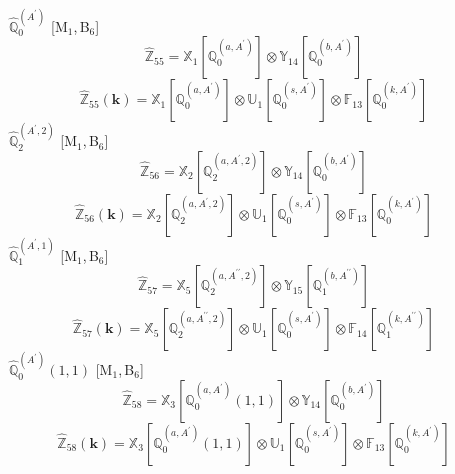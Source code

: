 \documentclass[fleqn,10pt,landscape]{article}
\begin{document}
\begin{itemize}
\vspace{4mm}
\noindent {} $\,\,\,\hat{\mathbb{Q}}_{0}^{(A^{\prime})}$ [M$_{1}$,\,B$_{6}$]
\begin{dmath*}
\hat{\mathbb{Z}}_{55}=\mathbb{X}_{1}[\mathbb{Q}_{0}^{(a,A^{\prime})}] \otimes\mathbb{Y}_{14}[\mathbb{Q}_{0}^{(b,A^{\prime})}]
\end{dmath*}
\begin{dmath*}
\hat{\mathbb{Z}}_{55}(\bm{k})=\mathbb{X}_{1}[\mathbb{Q}_{0}^{(a,A^{\prime})}] \otimes\mathbb{U}_{1}[\mathbb{Q}_{0}^{(s,A^{\prime})}] \otimes\mathbb{F}_{13}[\mathbb{Q}_{0}^{(k,A^{\prime})}]
\end{dmath*}
\vspace{4mm}
\noindent {} $\,\,\,\hat{\mathbb{Q}}_{2}^{(A^{\prime},2)}$ [M$_{1}$,\,B$_{6}$]
\begin{dmath*}
\hat{\mathbb{Z}}_{56}=\mathbb{X}_{2}[\mathbb{Q}_{2}^{(a,A^{\prime},2)}] \otimes\mathbb{Y}_{14}[\mathbb{Q}_{0}^{(b,A^{\prime})}]
\end{dmath*}
\begin{dmath*}
\hat{\mathbb{Z}}_{56}(\bm{k})=\mathbb{X}_{2}[\mathbb{Q}_{2}^{(a,A^{\prime},2)}] \otimes\mathbb{U}_{1}[\mathbb{Q}_{0}^{(s,A^{\prime})}] \otimes\mathbb{F}_{13}[\mathbb{Q}_{0}^{(k,A^{\prime})}]
\end{dmath*}
\vspace{4mm}
\noindent {} $\,\,\,\hat{\mathbb{Q}}_{1}^{(A^{\prime},1)}$ [M$_{1}$,\,B$_{6}$]
\begin{dmath*}
\hat{\mathbb{Z}}_{57}=\mathbb{X}_{5}[\mathbb{Q}_{2}^{(a,A^{\prime\prime},2)}] \otimes\mathbb{Y}_{15}[\mathbb{Q}_{1}^{(b,A^{\prime\prime})}]
\end{dmath*}
\begin{dmath*}
\hat{\mathbb{Z}}_{57}(\bm{k})=\mathbb{X}_{5}[\mathbb{Q}_{2}^{(a,A^{\prime\prime},2)}] \otimes\mathbb{U}_{1}[\mathbb{Q}_{0}^{(s,A^{\prime})}] \otimes\mathbb{F}_{14}[\mathbb{Q}_{1}^{(k,A^{\prime\prime})}]
\end{dmath*}
\vspace{4mm}
\noindent {} $\,\,\,\hat{\mathbb{Q}}_{0}^{(A^{\prime})}(1,1)$ [M$_{1}$,\,B$_{6}$]
\begin{dmath*}
\hat{\mathbb{Z}}_{58}=\mathbb{X}_{3}[\mathbb{Q}_{0}^{(a,A^{\prime})}(1,1)] \otimes\mathbb{Y}_{14}[\mathbb{Q}_{0}^{(b,A^{\prime})}]
\end{dmath*}
\begin{dmath*}
\hat{\mathbb{Z}}_{58}(\bm{k})=\mathbb{X}_{3}[\mathbb{Q}_{0}^{(a,A^{\prime})}(1,1)] \otimes\mathbb{U}_{1}[\mathbb{Q}_{0}^{(s,A^{\prime})}] \otimes\mathbb{F}_{13}[\mathbb{Q}_{0}^{(k,A^{\prime})}]

\end{dmath*}
\end{itemize}
\end{document}
